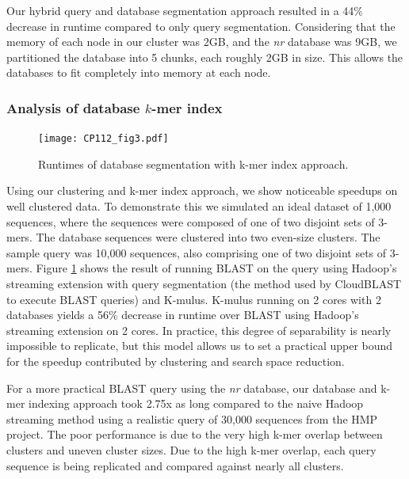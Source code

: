\documentclass[12pt,\mydriver]{thesis}
\begin{document}
Our hybrid query and database segmentation approach resulted in a 44\% decrease in runtime compared to only query segmentation.
Considering that the memory of each node in our cluster was 2GB, and the \emph{nr} database was 9GB, we partitioned the database into 5 chunks, each roughly 2GB in size.
This allows the databases to fit completely into memory at each node.

\subsubsection{Analysis of database $k$-mer index}


\begin{figure}[!htb]\begin{center}
\texttt{[image: CP112\_fig3.pdf]}
\end{center}
\renewcommand{\baselinestretch}{1}
\small\normalsize
\begin{quote}
\caption[Runtimes of database segmentation with k-mer index approach]{Runtimes of database segmentation with k-mer index approach.}
\label{fig:db_index}
\end{quote}
\end{figure}
\renewcommand{\baselinestretch}{2}
\small\normalsize


Using our clustering and k-mer index approach, we show noticeable speedups on well clustered data.
To demonstrate this we simulated an ideal dataset of 1,000 sequences, where the sequences were composed of one of two disjoint sets of 3-mers.
The database sequences were clustered into two even-size clusters.
The sample query was 10,000 sequences, also comprising one of two disjoint sets of 3-mers.
Figure \ref{fig:db_index} shows the result of running BLAST on the query using Hadoop's streaming extension with query segmentation (the method used by CloudBLAST to execute BLAST queries) and K-mulus.
K-mulus running on 2 cores with 2 databases yields a 56\% decrease in runtime over BLAST using Hadoop's streaming extension on 2 cores.
In practice, this degree of separability is nearly impossible to replicate, but this model allows us to set a practical upper bound for the speedup contributed by clustering and search space reduction.

For a more practical BLAST query using the \emph{nr} database, our database and k-mer indexing approach took 2.75x as long compared to the naive Hadoop streaming method using a realistic query of 30,000 sequences from the HMP project. The poor performance is due to the very high k-mer overlap between clusters and uneven cluster sizes.
Due to the high k-mer overlap, each query sequence is being replicated and compared against nearly all clusters.
\end{document}
